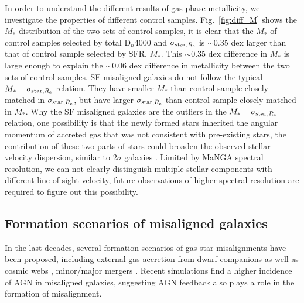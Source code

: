 In order to understand the different results of gas-phase metallicity, we investigate the properties of different control samples. Fig.~\ref{fig:diff_M} shows the $M_*$ distribution of the two sets of control samples, it is clear that the $M_*$ of control samples selected by total D$_n$4000 and $\sigma_{{\rm star}, R_{\rm e}}$ is $\sim$0.35 dex larger than that of control sample selected by SFR, $M_*$. This $\sim$0.35 dex difference in $M_*$ is large enough to explain the $\sim$0.06 dex difference in metallicity between the two sets of control samples. SF misaligned galaxies do not follow the typical $M_*-\sigma_{{\rm star}, R_{\rm e}}$ relation. They have smaller $M_*$ than control sample closely matched in $\sigma_{{\rm star}, R_{\rm e}}$, but have larger $\sigma_{{\rm star}, R_{\rm e}}$ than control sample closely matched in $M_*$. Why the SF misaligned galaxies are the outliers in the $M_*-\sigma_{{\rm star}, R_{\rm e}}$ relation, one possibility is that the newly formed stars inherited the angular momentum of accreted gas that was not consistent with pre-existing stars, the contribution of these two parts of stars could broaden the observed stellar velocity dispersion, similar to 2$\sigma$ galaxies \citep{krajnovic_atlas3d_2011}. Limited by MaNGA spectral resolution, we can not clearly distinguish multiple stellar components with different line of sight velocity, future observations of higher spectral resolution are required to figure out this possibility.

\subsection{Formation scenarios of misaligned galaxies}
\label{sec:discussion-2}

In the last decades, several formation scenarios of gas-star misalignments have been proposed, including external gas accretion from dwarf companions as well as cosmic webs \citep{1998ApJ...506...93T, chen_growth_2016, jin_sdss-iv_2016}, minor/major mergers \citep{naab_atlas3d_2014, li_impact_2020}. Recent simulations \citep{starkenburg_origin_2019, duckworth_decoupling_2020, koudmani_little_2021} find a higher incidence of AGN in misaligned galaxies, suggesting AGN feedback also plays a role in the formation of misalignment.

